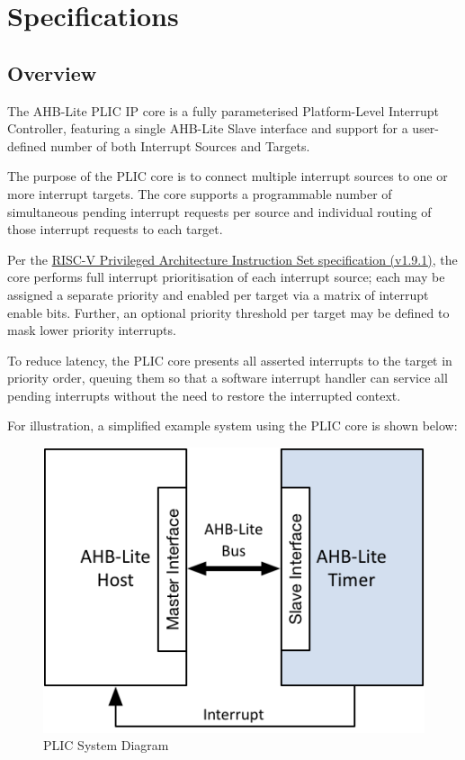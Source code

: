 \chapter{Specifications} \label{specifications}

\section{Overview}

The AHB-Lite PLIC IP core is a fully parameterised Platform-Level Interrupt
Controller, featuring a single AHB-Lite Slave interface and support for a user-defined number of both Interrupt Sources and Targets.

The purpose of the PLIC core is to connect multiple interrupt sources to
one or more interrupt targets. The core supports a programmable number
of simultaneous pending interrupt requests per source and individual routing of those interrupt requests to each target.

Per the \href{https://github.com/riscv/riscv-isa-manual/blob/master/release/riscv-privileged-v1.9.1.pdf}{RISC-V Privileged Architecture Instruction Set specification (v1.9.1)}, the core performs full interrupt prioritisation of each interrupt source; each may be assigned a separate priority and enabled per target via a matrix of interrupt enable bits. Further, an optional priority threshold per target may be defined to mask lower priority interrupts.

To reduce latency, the PLIC core presents all asserted interrupts to the target in priority order, queuing them so that a software interrupt handler can service all pending interrupts without the need to restore the interrupted context.

For illustration, a simplified example system using the PLIC core is shown below:

\begin{figure}[!htb]
	\includegraphics{assets/img/plic-system}
	\caption{PLIC System Diagram}
	\label{fig:SYSDIAG}
\end{figure}

